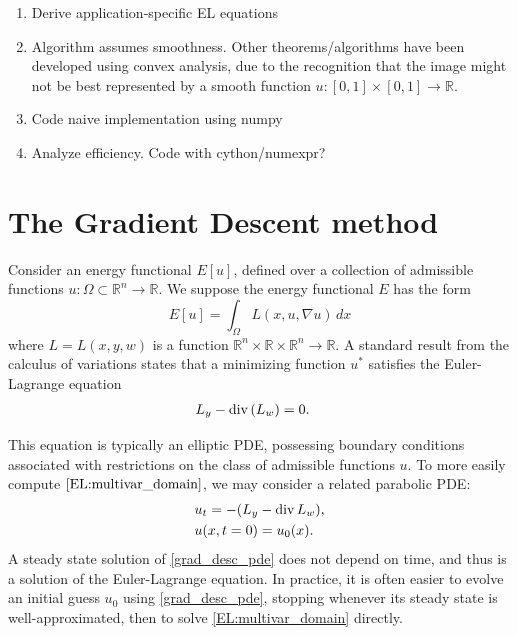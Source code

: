 \label{lab:tv_images}



\begin{enumerate}
\item Derive application-specific EL equations
\item Algorithm assumes smoothness.
Other theorems/algorithms have been developed using convex analysis, due to the recognition that the image might not be best represented by a smooth function $u:[0,1]\times [0,1] \to \mathbb{R}$. 
\item Code naive implementation using numpy
\item Analyze efficiency. 
Code with cython/numexpr?
\end{enumerate}

\section*{The Gradient Descent method}
Consider an energy functional $E[u]$, defined over a collection of admissible functions $u:\Omega \subset \mathbb{R}^n \to \mathbb{R}$. 
We suppose the energy functional $E$ has the form 
\[E[u] = \int_{\Omega} L(x,u,\nabla u) \, dx\]
where $L = L(x,y,w)$ is a function $\mathbb{R}^n \times \mathbb{R} \times \mathbb{R}^n \to \mathbb{R}$. 
A standard result from the calculus of variations states that a minimizing function $u^*$ satisfies the Euler-Lagrange equation
\begin{align}
L_y - {\rm div}\,(L_w) &= 0.	\label{EL:multivar_domain}
\end{align}

This equation is typically an elliptic PDE, possessing boundary conditions associated with  restrictions on the class of admissible functions $u$.
To more easily compute $\eqref{EL:multivar_domain}$, we may consider a related parabolic PDE:
\begin{align}
	\begin{split}
	&{ } u_t = -(L_y - {\rm div}\, L_w),\\
	&{ } u(x,t=0) = u_0(x).
	\end{split} \label{grad_desc_pde}
\end{align}
A steady state solution of \eqref{grad_desc_pde} does not depend on time, and thus is a solution of the Euler-Lagrange equation. 
In practice, it is often easier to evolve an initial guess $u_0$ using \eqref{grad_desc_pde}, stopping whenever its steady state is well-approximated, then to solve \eqref{EL:multivar_domain} directly. 

